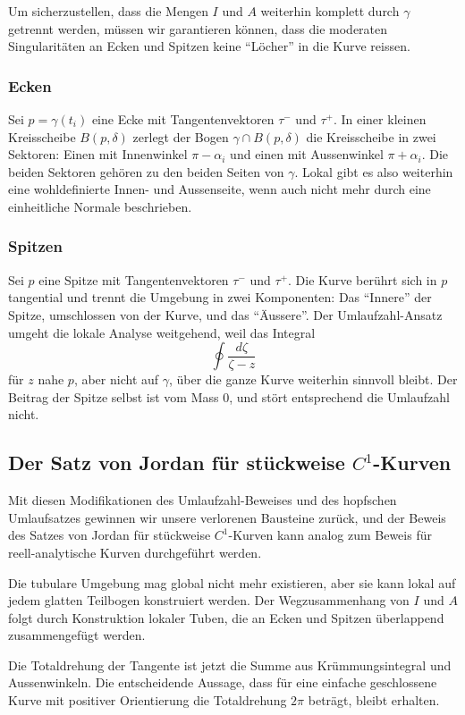 Um sicherzustellen, dass die Mengen $I$ und $A$ weiterhin komplett durch $\gamma$ getrennt werden, müssen wir garantieren können, dass die moderaten Singularitäten an Ecken und Spitzen keine ``Löcher'' in die Kurve reissen.

\subsubsection{Ecken}
Sei $p = \gamma(t_i)$ eine Ecke mit Tangentenvektoren $\tau^{-}$ und $\tau^{+}$.
In einer kleinen Kreisscheibe $B(p, \delta)$ zerlegt der Bogen $\gamma \cap B(p, \delta)$ die Kreisscheibe in zwei Sektoren: Einen mit Innenwinkel $\pi - \alpha_i$ und einen mit Aussenwinkel $\pi + \alpha_i$.
Die beiden Sektoren gehören zu den beiden Seiten von $\gamma$. Lokal gibt es also weiterhin eine wohldefinierte Innen- und Aussenseite, wenn auch nicht mehr durch eine einheitliche Normale beschrieben.

\subsubsection{Spitzen}
Sei $p$ eine Spitze mit Tangentenvektoren $\tau^{-}$ und $\tau^{+}$. 
Die Kurve berührt sich in $p$ tangential und trennt die Umgebung in zwei Komponenten: Das ``Innere'' der Spitze, umschlossen von der Kurve, und das ``Äussere''. 
Der Umlaufzahl-Ansatz umgeht die lokale Analyse weitgehend, weil das Integral
\[
    \oint \frac{d \zeta}{\zeta - z}
\]
für $z$ nahe $p$, aber nicht auf $\gamma$, über die ganze Kurve weiterhin sinnvoll bleibt.
Der Beitrag der Spitze selbst ist vom Mass 0, und stört entsprechend die Umlaufzahl nicht.

\subsection{Der Satz von Jordan für stückweise $C^1$-Kurven}

Mit diesen Modifikationen des Umlaufzahl-Beweises und des hopfschen Umlaufsatzes gewinnen wir unsere verlorenen Bausteine zurück, und der Beweis des Satzes von Jordan für stückweise $C^1$-Kurven kann analog zum Beweis für reell-analytische Kurven durchgeführt werden.

Die tubulare Umgebung mag global nicht mehr existieren, aber sie kann lokal auf jedem glatten Teilbogen konstruiert werden. Der Wegzusammenhang von $I$ und $A$ folgt durch Konstruktion lokaler Tuben, die an Ecken und Spitzen überlappend zusammengefügt werden.

Die Totaldrehung der Tangente ist jetzt die Summe aus Krümmungsintegral und Aussenwinkeln. Die entscheidende Aussage, dass für eine einfache geschlossene Kurve mit positiver Orientierung die Totaldrehung $2 \pi$ beträgt, bleibt erhalten.
